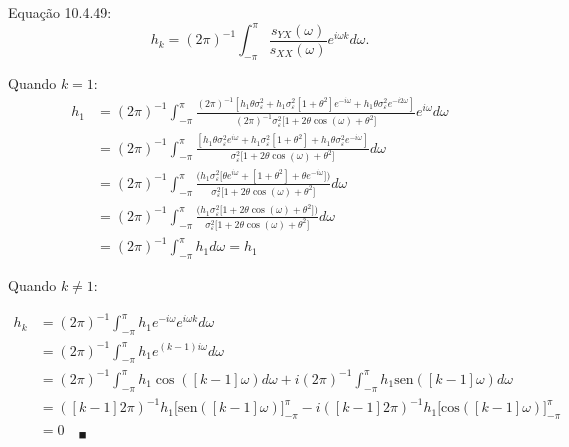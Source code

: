 \begin{enumerate}
\begin{enumerate}
		Equação 10.4.49:
		$$h_k=(2\pi)^{-1}\int_{-\pi}^{\pi}\frac{s_{YX}(\omega)}{s_{XX}(\omega)}e^{i\omega k} d\omega.$$
		
		Quando $k=1$:
		\begin{align*}
			h_1&=(2\pi)^{-1}\int_{-\pi}^{\pi}\frac{(2\pi)^{-1}[h_1\theta\sigma^2_{\varepsilon}+h_1\sigma^2_{\varepsilon}[1+\theta^2]e^{-i\omega}+h_1\theta\sigma^2_{\varepsilon}e^{-i2\omega}]}{(2\pi)^{-1}\sigma^2_{\varepsilon}\bigg[1+2\theta\cos(\omega)+\theta^2\bigg]}e^{i\omega} d\omega\\
			&=(2\pi)^{-1}\int_{-\pi}^{\pi}\frac{[h_1\theta\sigma^2_{\varepsilon}e^{i\omega}+h_1\sigma^2_{\varepsilon}[1+\theta^2]+h_1\theta\sigma^2_{\varepsilon}e^{-i\omega}]}{\sigma^2_{\varepsilon}\bigg[1+2\theta\cos(\omega)+\theta^2\bigg]} d\omega\\
			&=(2\pi)^{-1}\int_{-\pi}^{\pi}\frac{\bigg(h_1\sigma^2_{\varepsilon}\bigg[\theta e^{i\omega}+[1+\theta^2]+\theta e^{-i\omega}\bigg]\bigg)}{\sigma^2_{\varepsilon}\bigg[1+2\theta\cos(\omega)+\theta^2\bigg]} d\omega\\
			&=(2\pi)^{-1}\int_{-\pi}^{\pi}\frac{\bigg(h_1\sigma^2_{\varepsilon}\bigg[1+2\theta\cos(\omega)+\theta^2\bigg]\bigg)}{\sigma^2_{\varepsilon}\bigg[1+2\theta\cos(\omega)+\theta^2\bigg]} d\omega\\
			&=(2\pi)^{-1}\int_{-\pi}^{\pi}{h_1} d\omega=h_1
		\end{align*}
		
		Quando $k\neq 1$:
		
		\begin{align*}
			h_k&=(2\pi)^{-1}\int_{-\pi}^{\pi}h_1e^{-i\omega}e^{i\omega k}d\omega\\
			&=(2\pi)^{-1}\int_{-\pi}^{\pi}h_1e^{(k-1)i\omega}d\omega\\
			&=(2\pi)^{-1}\int_{-\pi}^{\pi}h_1\cos([k-1]\omega)d\omega+i(2\pi)^{-1}\int_{-\pi}^{\pi}h_1\text{sen}([k-1]\omega)d\omega\\
			&=([k-1]2\pi)^{-1}h_1\bigg[\text{sen}([k-1]\omega)\bigg]_{-\pi}^{\pi}-i([k-1]2\pi)^{-1}h_1\bigg[\text{cos}([k-1]\omega)\bigg]_{-\pi}^{\pi}\\
			&=0\quad_{\blacksquare}
		\end{align*}
\end{enumerate}
  
\end{enumerate}